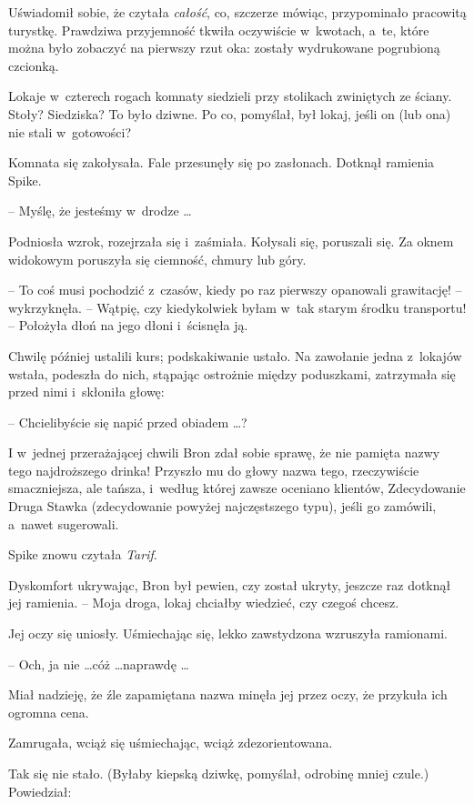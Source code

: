 \documentclass[oneside,polish,11pt,rmheadings]{mwbk}
\begin{document}
Uświadomił sobie, że czytała \textit{całość}, co, szczerze mówiąc, przypominało pracowitą turystkę. Prawdziwa przyjemność tkwiła oczywiście w~kwotach, a~te, które można było zobaczyć na pierwszy rzut oka: zostały wydrukowane pogrubioną czcionką. 

Lokaje w~czterech rogach komnaty siedzieli przy stolikach zwiniętych ze ściany. Stoły? Siedziska? To było dziwne. Po co, pomyślał, był lokaj, jeśli on (lub ona) nie stali w~gotowości? 

Komnata się zakołysała. Fale przesunęły się po zasłonach. Dotknął ramienia Spike. 

-- Myślę, że jesteśmy w~drodze \ldots  

Podniosła wzrok, rozejrzała się i~zaśmiała. Kołysali się, poruszali się. Za oknem widokowym poruszyła się ciemność, chmury lub góry. 

-- To coś musi pochodzić z~czasów, kiedy po raz pierwszy opanowali grawitację! -- wykrzyknęła. -- Wątpię, czy kiedykolwiek byłam w~tak starym środku transportu! -- Położyła dłoń na jego dłoni i~ścisnęła ją. 

Chwilę później ustalili kurs; podskakiwanie ustało. Na zawołanie jedna z~lokajów wstała, podeszła do nich, stąpając ostrożnie między poduszkami, zatrzymała się przed nimi i~skłoniła głowę: 

-- Chcielibyście się napić przed obiadem \ldots ? 

I w~jednej przerażającej chwili Bron zdał sobie sprawę, że nie pamięta nazwy tego najdroższego drinka! Przyszło mu do głowy nazwa tego, rzeczywiście smaczniejsza, ale tańsza, i~według której zawsze oceniano klientów, Zdecydowanie Druga Stawka (zdecydowanie powyżej najczęstszego typu), jeśli go zamówili, a~nawet sugerowali. 

Spike znowu czytała \textit{Tarif}. 

Dyskomfort ukrywając, Bron był pewien, czy został ukryty, jeszcze raz dotknął jej ramienia. -- Moja droga, lokaj chciałby wiedzieć, czy czegoś chcesz. 

Jej oczy się uniosły. Uśmiechając się, lekko zawstydzona wzruszyła ramionami.

-- Och, ja nie \ldots  cóż \ldots  naprawdę \ldots  

Miał nadzieję, że źle zapamiętana nazwa minęła jej przez oczy, że przykuła ich ogromna cena. 

Zamrugała, wciąż się uśmiechając, wciąż zdezorientowana. 

Tak się nie stało. (Byłaby kiepską dziwkę, pomyślał, odrobinę mniej czule.) Powiedział: 
\end{document}
